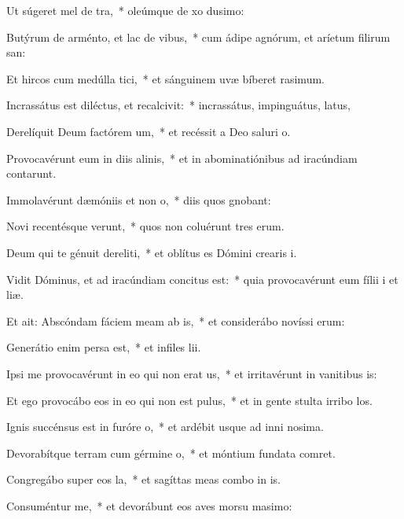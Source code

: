 \item Ut súgeret mel de tra,~* oleúmque de xo dusimo:
\item Butýrum de arménto, et lac de vibus,~* cum ádipe agnórum, et aríetum filirum san:
\item Et hircos cum medúlla tici,~* et sánguinem uvæ bíberet rasimum.
\item Incrassátus est diléctus, et recalcivit:~* incrassátus, impinguátus, latus,
\item Derelíquit Deum factórem um,~* et recéssit a Deo saluri o.
\item Provocavérunt eum in diis alinis,~* et in abominatiónibus ad iracúndiam contarunt.
\item Immolavérunt dæmóniis et non o,~* diis quos gnobant:
\item Novi recentésque verunt,~* quos non coluérunt tres erum.
\item Deum qui te génuit dereliti,~* et oblítus es Dómini crearis i.
\item \singlecolsep
\item Vidit Dóminus, et ad iracúndiam concitus est:~* quia provocavérunt eum fílii i et liæ.
\item Et ait: Abscóndam fáciem meam ab is,~* et considerábo novíssi erum:
\item Generátio enim persa est,~* et infiles lii.
\item Ipsi me provocavérunt in eo qui non erat us,~* et irritavérunt in vanitibus is:
\item Et ego provocábo eos in eo qui non est pulus,~* et in gente stulta irribo los.
\item Ignis succénsus est in furóre o,~* et ardébit usque ad inni nosima.
\item Devorabítque terram cum gérmine o,~* et móntium fundata comret.
\item Congregábo super eos la,~* et sagíttas meas combo in is.
\item Consuméntur me,~* et devorábunt eos aves morsu masimo:
